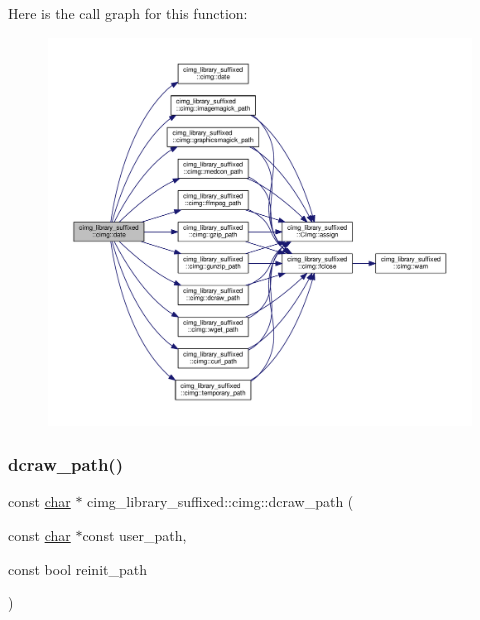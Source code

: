 Here is the call graph for this function\+:
\nopagebreak
\begin{figure}[H]
\begin{center}
\leavevmode
\includegraphics[width=350pt]{d4/d9b/namespacecimg__library__suffixed_1_1cimg_aac739bf544269324a04504ebe92b93e9_cgraph}
\end{center}
\end{figure}
\mbox{\label{namespacecimg__library__suffixed_1_1cimg_ad2459563e2ed326f303b9ac4e91744b0}} 
\subsubsection{\texorpdfstring{dcraw\+\_\+path()}{dcraw\_path()}}
{\footnotesize\ttfamily const \hyperlink{classchar}{char} $\ast$ cimg\+\_\+library\+\_\+suffixed\+::cimg\+::dcraw\+\_\+path (\begin{DoxyParamCaption}\item[{const \hyperlink{classchar}{char} $\ast$const}]{user\+\_\+path,  }\item[{const bool}]{reinit\+\_\+path }\end{DoxyParamCaption})\hspace{0.3cm}{\ttfamily [inline]}}




